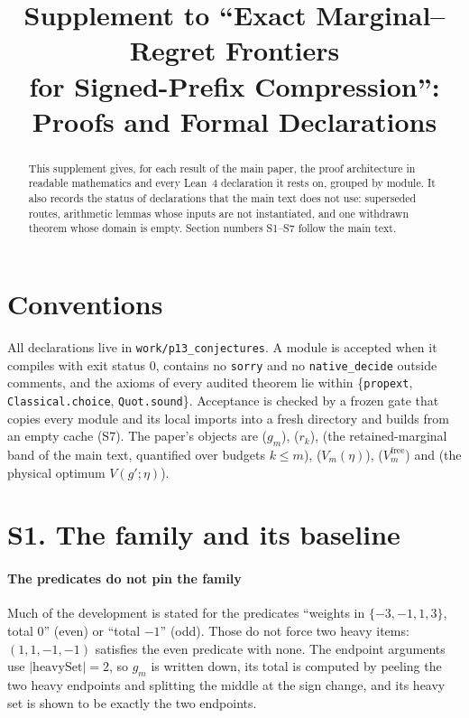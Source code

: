 



\title{Supplement to ``Exact Marginal--Regret Frontiers\\for Signed-Prefix Compression'':\\
Proofs and Formal Declarations}

\author{
}

\maketitle

\begin{abstract}
This supplement gives, for each result of the main paper, the proof architecture in
readable mathematics and every Lean~4 declaration it rests on, grouped by module. It also
records the status of declarations that the main text does not use: superseded routes,
arithmetic lemmas whose inputs are not instantiated, and one withdrawn theorem whose domain
is empty. Section numbers S1--S7 follow the main text.
\end{abstract}

\section*{Conventions}

All declarations live in \texttt{work/p13\_conjectures}. A module is accepted when it
compiles with exit status $0$, contains no \texttt{sorry} and no \texttt{native\_decide}
outside comments, and the axioms of every audited theorem lie within
\{\texttt{propext}, \texttt{Classical.choice}, \texttt{Quot.sound}\}. Acceptance is checked by
a frozen gate that copies every module and its local imports into a fresh directory and
builds from an empty cache (S7). The paper's objects are  ($g_{m}$),
 ($r_{k}$),  (the retained-marginal band of the main text,
quantified over budgets $k\le m$),  ($V_{m}(\eta)$), 
($V^{\mathrm{free}}_{m}$) and  (the physical optimum $V(g';\eta)$).

\section{S1. The family and its baseline}

\paragraph{The predicates do not pin the family} Much of the development is stated for the
predicates ``weights in $\{-3,-1,1,3\}$, total $0$'' (even) or ``total $-1$'' (odd). Those
do not force two heavy items: $(1,1,-1,-1)$ satisfies the even predicate with none. The
endpoint arguments use $|\mathrm{heavySet}|=2$, so $g_{m}$ is written down, its total is
computed by peeling the two heavy endpoints and splitting the middle at the sign change, and
its heavy set is shown to be exactly the two endpoints.

